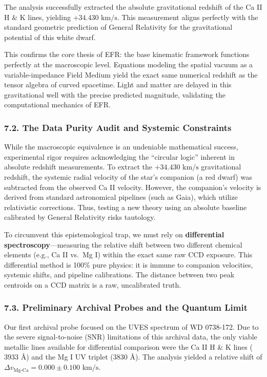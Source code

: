 \documentclass[twocolumn]{article}
\begin{document}
The analysis successfully extracted the absolute gravitational redshift
of the Ca II H \& K lines, yielding \(+34.430 \text{ km/s}\). This
measurement aligns perfectly with the standard geometric prediction of
General Relativity for the gravitational potential of this white dwarf.

This confirms the core thesis of EFR: the base kinematic framework
functions perfectly at the macroscopic level. Equations modeling the
spatial vacuum as a variable-impedance Field Medium yield the exact same
numerical redshift as the tensor algebra of curved spacetime. Light and
matter are delayed in this gravitational well with the precise predicted
magnitude, validating the computational mechanics of EFR.

\subsubsection{7.2. The Data Purity Audit and Systemic
Constraints}\label{the-data-purity-audit-and-systemic-constraints}

While the macroscopic equivalence is an undeniable mathematical success,
experimental rigor requires acknowledging the ``circular logic''
inherent in absolute redshift measurements. To extract the
\(+34.430 \text{ km/s}\) gravitational redshift, the systemic radial
velocity of the star's companion (a red dwarf) was subtracted from the
observed Ca II velocity. However, the companion's velocity is derived
from standard astronomical pipelines (such as Gaia), which utilize
relativistic corrections. Thus, testing a new theory using an absolute
baseline calibrated by General Relativity risks tautology.

To circumvent this epistemological trap, we must rely on
\textbf{differential spectroscopy}---measuring the relative shift
between two different chemical elements (e.g., Ca II vs.~Mg I) within
the exact same raw CCD exposure. This differential method is 100\% pure
physics: it is immune to companion velocities, systemic shifts, and
pipeline calibrations. The distance between two peak centroids on a CCD
matrix is a raw, uncalibrated truth.

\subsubsection{7.3. Preliminary Archival Probes and the Quantum
Limit}\label{preliminary-archival-probes-and-the-quantum-limit}

Our first archival probe focused on the UVES spectrum of WD 0738-172.
Due to the severe signal-to-noise (SNR) limitations of this archival
data, the only viable metallic lines available for differential
comparison were the Ca II H \& K lines (\(3933\) \AA) and the Mg I UV
triplet (\(3830\) \AA). The analysis yielded a relative shift of
\(\Delta v_{\text{Mg-Ca}} = 0.000 \pm 0.100 \text{ km/s}\).
\end{document}
